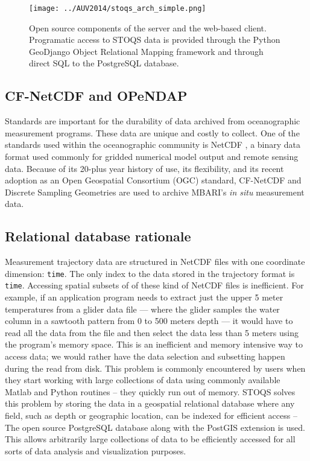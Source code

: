 \documentclass[conference]{IEEEtran}
\begin{document}
\begin{figure}[htbp]
\centering
\texttt{[image: ../AUV2014/stoqs\_arch\_simple.png]}
\caption{Open source components of the server and the web-based client. Programatic access to 
STOQS data is provided through the Python GeoDjango Object Relational Mapping framework 
and through direct SQL to the PostgreSQL database.}
\label{fig:STOQSArch}
\end{figure}

\subsection{CF-NetCDF and OPeNDAP}

Standards are important for the durability of data archived from oceanographic measurement programs. 
These data are unique and costly to collect. One of the standards used within 
the oceanographic community is NetCDF \cite{Rew1990}, a binary data format used 
commonly for gridded numerical model output and remote sensing data. Because of its 
20-plus year history of use, its flexibility, and its recent adoption as an 
Open Geospatial Consortium (OGC) standard, CF-NetCDF and Discrete Sampling Geometries
\cite{DSG} are used to archive MBARI's 
\textit{in situ} measurement data.

\subsection{Relational database rationale}

Measurement trajectory data are
structured in NetCDF files with one coordinate dimension: \texttt{time}. 
  The only index to the data stored in the trajectory format is \texttt{time}. 
Accessing spatial subsets of of these kind of NetCDF files
is inefficient.  For example, 
if an application program needs to extract just the upper 5 meter temperatures from 
a glider data file --- where the glider samples the water column in a sawtooth 
pattern from 0 to 500 meters depth --- it would have to read all 
the data from the file and then select the data less than 5 meters using the program's 
memory space.  This is an
inefficient and memory intensive way to access data; we would rather have the data selection
and subsetting happen during the read from disk. This problem is commonly
encountered by users when they start working with large collections of data 
using commonly available Matlab and Python routines -- they quickly run out of memory. 
STOQS solves this problem by storing the 
data in a geospatial relational database where any field, such as depth 
or geographic location, can be indexed for efficient access --
The open source PostgreSQL 
database along with the PostGIS extension is used. This allows arbitrarily large collections
of data to be efficiently accessed for all sorts of data analysis and visualization
purposes.
\end{document}
